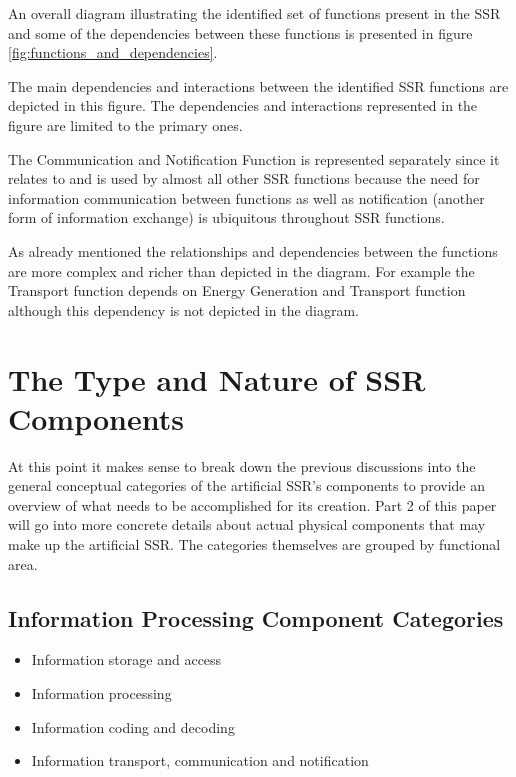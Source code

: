 An overall diagram illustrating
the identified set of functions present in the SSR and some of the
dependencies between these functions is presented in figure \ref{fig:functions_and_dependencies}.

The main dependencies and interactions between the identified SSR
functions are depicted in this figure. The dependencies and interactions
represented in the figure are limited to the primary ones.

The Communication and Notification Function is represented separately
since it relates to and is used by almost all other SSR functions
because the need for information communication between functions as
well as notification (another form of information exchange) is
ubiquitous throughout SSR functions.

As already mentioned the relationships and dependencies between the
functions are more complex and richer than depicted in the diagram. For
example the Transport function depends on Energy Generation and
Transport function although this dependency is not depicted in the
diagram.


\section{The Type and Nature of SSR Components}

At this point it makes sense to break down the previous discussions
into the general conceptual categories of the artificial SSR's components
to provide an overview of what needs to be accomplished for its creation.
Part 2 of this paper will go into more concrete details about actual
physical components that may make up the artificial SSR.  The categories
themselves are grouped by functional area.

\subsection{Information Processing Component Categories}
\begin{itemize}
\item Information storage and access
\item Information processing
\item Information coding and decoding
\item Information transport, communication and notification
\end{itemize}

